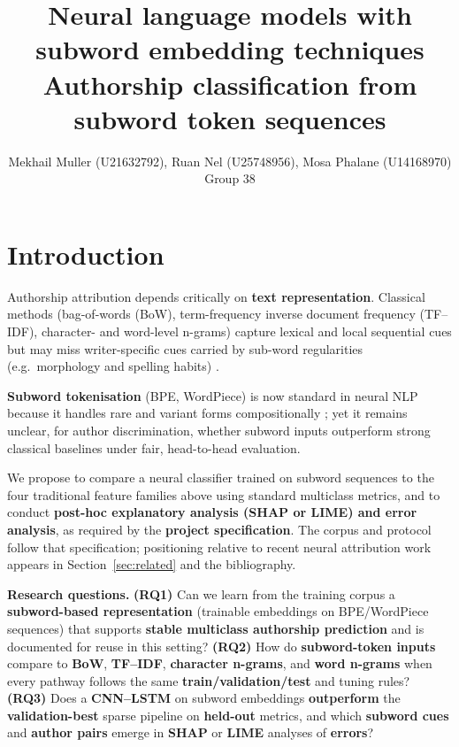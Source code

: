 \documentclass[11pt]{article}
\title{Neural language models with subword embedding techniques\\{\normalsize\bfseries Authorship classification from subword token sequences}}
\author{Mekhail Muller (U21632792), Ruan Nel (U25748956), Mosa Phalane (U14168970) \\ Group 38}
\begin{document}
\maketitle
\vspace{-0.65\baselineskip}

\section{Introduction}
\label{sec:intro}
Authorship attribution depends critically on \textbf{text representation}. Classical methods (bag-of-words ({BoW}), term-frequency inverse document frequency ({TF--IDF}), character- and word-level {n}-grams) capture lexical and local sequential cues but may miss writer-specific cues carried by sub-word regularities (e.g.\ morphology and spelling habits) \cite{suman2021authorship,theophilo2021authorship,modupe2022applied}.

\textbf{Subword tokenisation} ({BPE}, {WordPiece}) is now standard in neural {NLP} because it handles rare and variant forms compositionally \cite{sennrich2016neural}; yet it remains unclear, for author discrimination, whether subword inputs outperform strong classical baselines under fair, head-to-head evaluation.

We propose to compare a neural classifier trained on subword sequences to the four traditional feature families above using standard multiclass metrics, and to conduct \textbf{post-hoc explanatory analysis ({SHAP} or {LIME}) and error analysis}, as required by the \textbf{project specification}. The corpus and protocol follow that specification; positioning relative to recent neural attribution work appears in Section~\ref{sec:related} and the bibliography.

\noindent\textbf{Research questions.} \textbf{(RQ1)} Can we learn from the training corpus a \textbf{subword-based representation} (trainable embeddings on {BPE}/{WordPiece} sequences) that supports \textbf{stable multiclass authorship prediction} and is documented for reuse in this setting? \textbf{(RQ2)} How do \textbf{subword-token inputs} compare to \textbf{{BoW}}, \textbf{{TF--IDF}}, \textbf{character {n}-grams}, and \textbf{word {n}-grams} when every pathway follows the same \textbf{train/validation/test} and tuning rules? \textbf{(RQ3)} Does a \textbf{{CNN}--{LSTM}} on subword embeddings \textbf{outperform} the \textbf{validation-best} sparse pipeline on \textbf{held-out} metrics, and which \textbf{subword cues} and \textbf{author pairs} emerge in \textbf{{SHAP}} or \textbf{{LIME}} analyses of \textbf{errors}?
\end{document}
